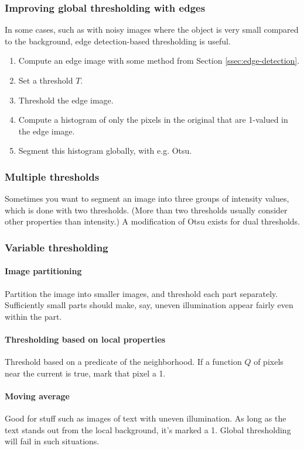 \subsubsection{Improving global thresholding with edges}
In some cases, such as with noisy images where the object is very small compared to the background, edge detection-based thresholding is useful.
\begin{enumerate}
    \item Compute an edge image with some method from Section \ref{ssec:edge-detection}.
    \item Set a threshold $T$.
    \item Threshold the edge image.
    \item Compute a histogram of only the pixels in the original that are 1-valued in the edge image.
    \item Segment this histogram globally, with e.g. Otsu.
\end{enumerate}

\subsubsection{Multiple thresholds}
Sometimes you want to segment an image into three groups of intensity values, which is done with two thresholds. (More than two thresholds usually consider other properties than intensity.) A modification of Otsu exists for dual thresholds.

\subsubsection{Variable thresholding}

\paragraph{Image partitioning} Partition the image into smaller images, and threshold each part separately. Sufficiently small parts should make, say, uneven illumination appear fairly even within the part.

\paragraph{Thresholding based on local properties} Threshold based on a predicate of the neighborhood. If a function $Q$ of pixels near the current is true, mark that pixel a 1.

\paragraph{Moving average} Good for stuff such as images of text with uneven illumination. As long as the text stands out from the local background, it's marked a 1. Global thresholding will fail in such situations.

